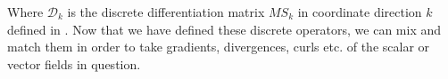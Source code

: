 \documentclass[10pt]{article}
\begin{document}
  Where $\mathcal{D}_k$ is the discrete differentiation matrix $MS_k$ in coordinate direction
  $k$ defined in \cite{hesthaven2007nodal}. Now that we have defined these discrete operators, we
  can mix and match them in order to take gradients, divergences, curls etc. of the scalar or vector
  fields in question.

\nocite{*}
{
  }
\end{document}
